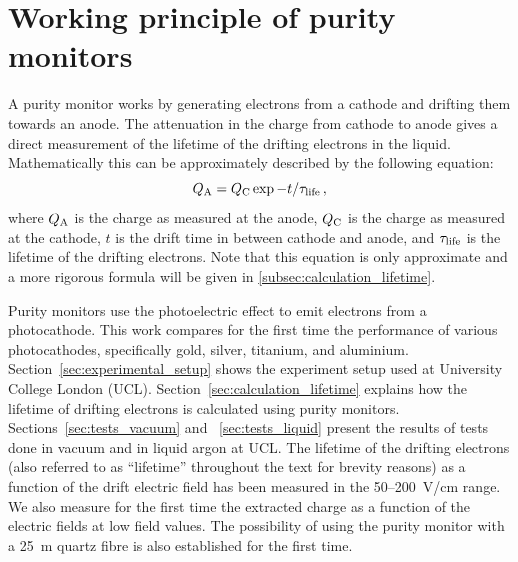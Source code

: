 \documentclass[a4paper,11pt]{article}
\newcommand{\QC}{\ensuremath{Q_{\rm C}}\xspace}
\newcommand{\QA}{\ensuremath{Q_{\rm A}}\xspace}
\newcommand{\taulife}{\ensuremath{\tau_{\rm life}}\xspace}
\begin{document}
\section{Working principle of purity monitors}
\label{sec:purity_monitors}
A purity monitor works by generating electrons from a cathode and drifting them towards an anode. 
The attenuation in the charge from cathode to anode gives a direct measurement of the lifetime of the drifting electrons in the liquid.
Mathematically this can be approximately described by the following equation:
\begin{equation}
    \QA = \QC \exp{-t/\taulife} \,,
\end{equation}
\noindent where \QA is the charge as measured at the anode, \QC is the charge as measured at the cathode, $t$ is the drift time in between cathode and anode, and \taulife is the lifetime of the drifting electrons. Note that this equation is only approximate and a more rigorous formula will be given in \ref{subsec:calculation_lifetime}.

Purity monitors use the photoelectric effect to emit electrons from a photocathode. This work compares for the first time the performance of various photocathodes, specifically gold, silver, titanium, and aluminium. %
Section~\ref{sec:experimental_setup} shows the experiment setup used at University College London (UCL). 
Section~\ref{sec:calculation_lifetime} explains how the lifetime of drifting electrons is calculated using purity monitors.
Sections~\ref{sec:tests_vacuum} and ~\ref{sec:tests_liquid} present the results of tests done in vacuum and in liquid argon at UCL. The lifetime of the drifting electrons (also referred to as ``lifetime'' throughout the text for brevity reasons) as a function of the drift electric field has been measured in the 50--\SI{200}{V/cm} range. %
We also measure for the first time the extracted charge as a function of the electric fields at low field values. 
The possibility of using the purity monitor with a \SI{25}{m} quartz fibre is also established for the first time.  
\end{document}
